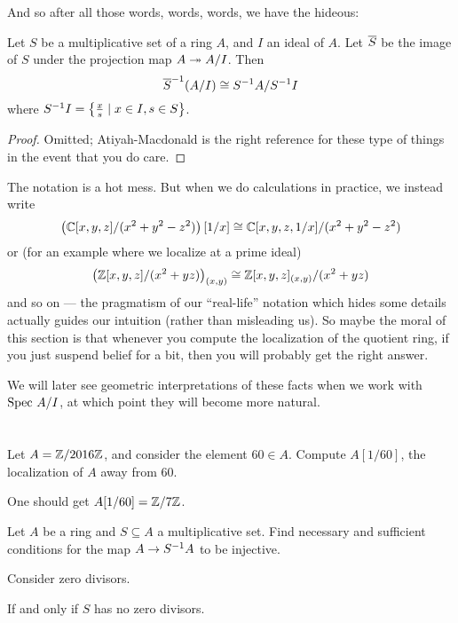 And so after all those words, words, words, we have the hideous:
\begin{theorem}
	\label{thm:localization_commute_quotient}
	Let $S$ be a multiplicative set of a ring $A$,
	and $I$ an ideal of $A$.
	Let $\overline S$ be the image of $S$
	under the projection map $A \twoheadrightarrow A/I$.
	Then
	\[ {\overline S}^{-1} (A/I) \cong S^{-1} A / S^{-1} I \]
	where $S^{-1} I = \left\{ \frac{x}{s} \mid x \in I, s \in S \right\}$.
\end{theorem}
\begin{proof}
	Omitted; Atiyah-Macdonald is the right reference for these
	type of things in the event that you do care.
\end{proof}
The notation is a hot mess.
But when we do calculations in practice, we instead write
\[ \left( \mathbb C[x,y,z]/(x^2 + y^2 - z^2) \right)[1/x]
	\cong \mathbb C[x,y,z,1/x] / (x^2 + y^2 - z^2) \]
or (for an example where we localize at a prime ideal)
\[ \left( \mathbb Z[x,y,z]/ (x^2 + yz) \right)_{(x,y)}
	\cong \mathbb Z[x,y,z]_{(x,y)} / (x^2 + yz) \]
and so on --- the pragmatism of our ``real-life'' notation
which hides some details actually guides our intuition
(rather than misleading us).
So maybe the moral of this section is that whenever
you compute the localization of the quotient ring,
if you just suspend belief for a bit,
then you will probably get the right answer.

We will later see geometric interpretations of these facts
when we work with $\text{Spec } A/I$,
at which point they will become more natural.

\section{\problemhead}
\begin{problem}
	Let $A = \mathbb Z/2016\mathbb Z$, and consider the element $60 \in A$.
	Compute $A[1/60]$, the localization of $A$ away from $60$.
	\begin{sol}
		One should get $A[1/60] = \mathbb Z/7\mathbb Z$.
	\end{sol}
\end{problem}

\begin{problem}
	Let $A$ be a ring and $S \subseteq A$ a multiplicative set.
	Find necessary and sufficient conditions
	for the map $A \to S^{-1} A$ to be injective.
	\begin{hint}
		Consider zero divisors.
	\end{hint}
	\begin{sol}
		If and only if $S$ has no zero divisors.
	\end{sol}
\end{problem}

